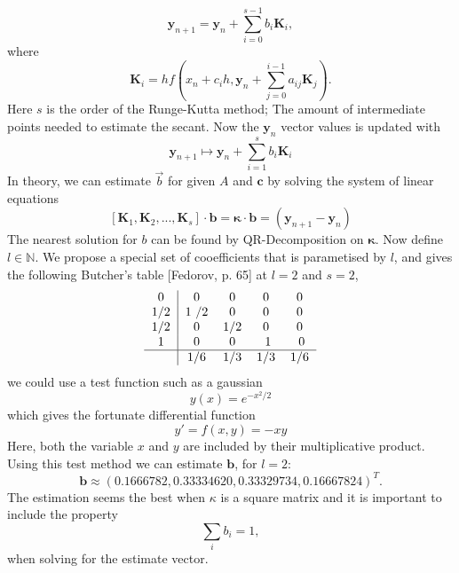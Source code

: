 \documentclass{article}
\begin{document}
\begin{equation}
	\pmb y_{n + 1} = \pmb y_n + \sum_{i = 0}^{s - 1} b_i\pmb K_i,
\end{equation}
where
\begin{equation}
	\pmb K_i = hf(x_n + c_i h, \pmb y_n + \sum_{j = 0}^{i - 1} a_{ij}\pmb K_j).
\end{equation}
Here $s$ is the order of the Runge-Kutta method; The amount of intermediate points needed to estimate the secant. Now the $\pmb y_n$ vector values is updated with 
\begin{equation}
	\pmb y_{n+1} \mapsto \pmb y_n + \sum_{i = 1}^sb_i\pmb K_i
\end{equation}
In theory, we can estimate $\vec b$ for given $A$ and $\pmb c$ by solving the system of linear equations
\begin{equation}
	\left[\pmb K_1, \pmb K_2, ..., \pmb K_s \right]\cdot\pmb b  = \pmb \kappa\cdot \pmb b= (\pmb y_{n+1} - \pmb y_n)
\end{equation}
The nearest solution for $b$ can be found by QR-Decomposition on $\pmb \kappa$.
Now define $l\in \mathbb{N}$. We propose a special set of cooefficients that is parametised by $l$, and gives the following Butcher's table [Fedorov, p. 65] at $l = 2$ and $s = 2$, 
\begin{align}
\begin{tabular}{c|c c c c}
0 & 0 & 0 & 0 & 0 \\
1/2 & 1 /2 & 0 & 0 & 0\\
1/2 & 0 & 1/2 & 0 & 0\\
1 &   0 & 0 & \ 1\  & \ 0\  \\
\hline
& 1/6  & 1/3 & 1/3 & 1/6
\end{tabular}
\end{align}
we could use a test function such as a gaussian
\begin{equation}
	y(x) = e^{-x^2/2}
\end{equation}
which gives the fortunate differential function
\begin{equation}
	y' = f(x, y) = -xy
\end{equation}
Here, both the variable $x$ and $y$ are included by their multiplicative product. Using this test method we can estimate $\pmb b$, for $l = 2$:
\begin{equation}
 \pmb b \approx (0.1666782, 0.33334620, 0.33329734, 0.16667824)^T.
\end{equation}
The estimation seems the best when $\kappa$ is a square matrix and it is important to include the property
\begin{equation}
	\sum_i b_i = 1,
\end{equation}
when solving for the estimate vector.\\
\end{document}
